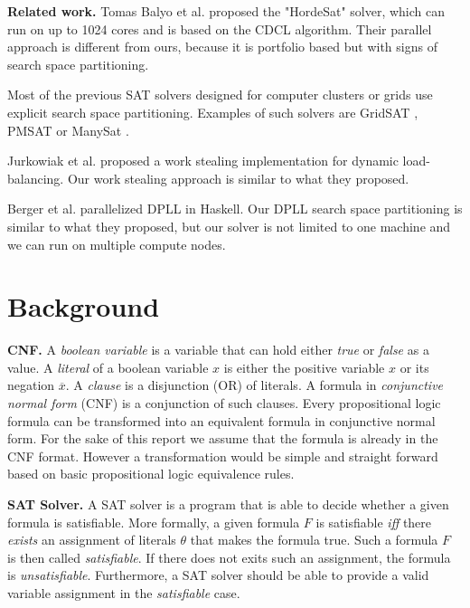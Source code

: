 \documentclass[letterpaper]{article}
\newcommand{\mypar}[1]{{\bf #1.}}
\begin{document}
\mypar{Related work}
Tomas Balyo et al. proposed the "HordeSat" solver, which can run on up to 1024 cores and is based on the CDCL algorithm.
Their parallel approach is different from ours, because it is portfolio based but with signs of search space partitioning. \cite{hordesat}

Most of the previous SAT solvers designed for computer clusters or grids use explicit search space partitioning.
Examples of such solvers are GridSAT \cite{gridsat}, PMSAT \cite{pmsat} or ManySat \cite{manysat}.

Jurkowiak et al. proposed a work stealing implementation for dynamic load-balancing. \cite{stealing}
Our work stealing approach is similar to what they proposed.

Berger et al. parallelized DPLL in Haskell. \cite{dpll_haskell}
Our DPLL search space partitioning is similar to what they proposed, but our solver is not limited to one machine and we can run on multiple compute nodes.

\section{Background}\label{sec:background}

\mypar{CNF}
A \textit{boolean variable} is a variable that can hold either \textit{true} or \textit{false} as a value.
A \textit{literal} of a boolean variable $x$ is either the positive variable $x$ or its negation $\overline{x}$.
A \textit{clause} is a disjunction (OR) of literals.
A formula in \textit{conjunctive normal form} (CNF) is a conjunction of such clauses.
Every propositional logic formula can be transformed into an equivalent formula in conjunctive normal form.
For the sake of this report we assume that the formula is already in the CNF format.
However a transformation would be simple and straight forward based on basic propositional logic equivalence rules.

\mypar{SAT Solver}
A SAT solver is a program that is able to decide whether a given formula is satisfiable.
More formally, a given formula $F$ is satisfiable \textit{iff} there \textit{exists} an assignment of literals $\theta$ that makes the formula true.
Such a formula $F$ is then called \textit{satisfiable}.
If there does not exits such an assignment, the formula is \textit{unsatisfiable}.
Furthermore, a SAT solver should be able to provide a valid variable assignment in the \textit{satisfiable} case.
\end{document}
